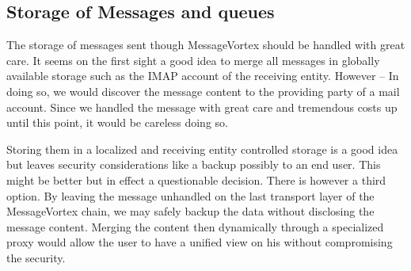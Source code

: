 \subsection{Storage of Messages and queues}
The storage of messages sent though MessageVortex should be handled with great care. It seems on the first sight a good idea to merge all messages in globally available storage such as the IMAP account of the receiving entity. However -- In doing so, we would discover the message content to the providing party of a mail account. Since we handled the message with great care and tremendous costs up until this point, it would be careless doing so. 

Storing them in a localized and receiving entity controlled storage is a good idea but leaves security considerations like a backup possibly to an end user. This might be better but in effect a questionable decision. There is however a third option. By leaving the message unhandled on the last transport layer of the MessageVortex chain, we may safely backup the data without disclosing the message content. Merging the content then dynamically through a specialized proxy would allow the user to have a unified view on his without compromising the security.

